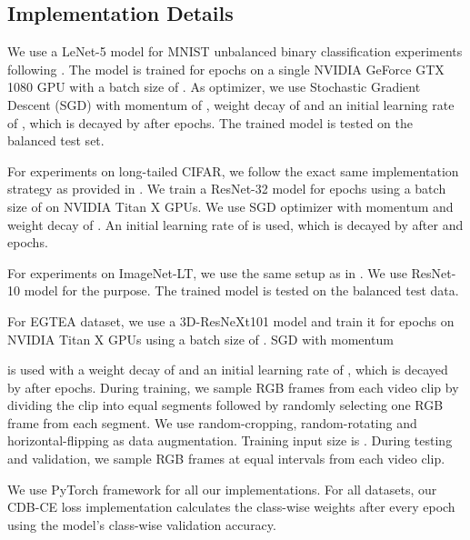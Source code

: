 \documentclass[runningheads]{llncs}
\begin{document}
\subsection{Implementation Details}
We use a LeNet-5 \cite{LeNet} model for MNIST unbalanced binary classification 
experiments following \cite{reweighting_examples}. The model is trained for  epochs on a single 
NVIDIA GeForce GTX 1080 GPU with a batch size of . As optimizer, we use 
Stochastic Gradient Descent (SGD) with momentum of , weight decay of 
 and an initial learning rate of , which is decayed by  
after  
epochs. The trained model is tested on the balanced test set.



For experiments on long-tailed CIFAR, we follow the exact same implementation
strategy as provided in \cite{Class_balancedloss}. We train a ResNet-32 \cite{ResNet} model for  epochs 
using a batch size of  on  NVIDIA Titan X GPUs. We use SGD optimizer with 
momentum  and weight decay of . An initial learning rate of  
is 
used, which is decayed by  after  and  epochs.

For experiments on ImageNet-LT, we use the same setup as in \cite{OLTR}. We use ResNet-10 \cite{ResNet} model for the purpose. The trained model is tested on the balanced test data. 

For EGTEA dataset, we use a 3D-ResNeXt101 \cite{ResNeXt,3DResNext} model and train it for 
epochs on  NVIDIA Titan X GPUs using a batch size of . SGD with momentum 

is used with a weight decay of  and an initial learning rate of , 
which is decayed by  after  epochs. During training, we sample  RGB 
frames from each video clip by dividing the clip into  equal segments 
followed 
by randomly selecting one RGB frame from each segment. We use random-cropping, 
random-rotating and horizontal-flipping as data augmentation. Training input 
size is .
During testing and validation, we sample  RGB frames at equal intervals from 
each video clip. 

We use PyTorch \cite{Pytorch} framework for all our implementations. For all datasets, our CDB-CE loss implementation calculates the class-wise weights after every epoch using the model's 
class-wise validation accuracy. 
\end{document}

